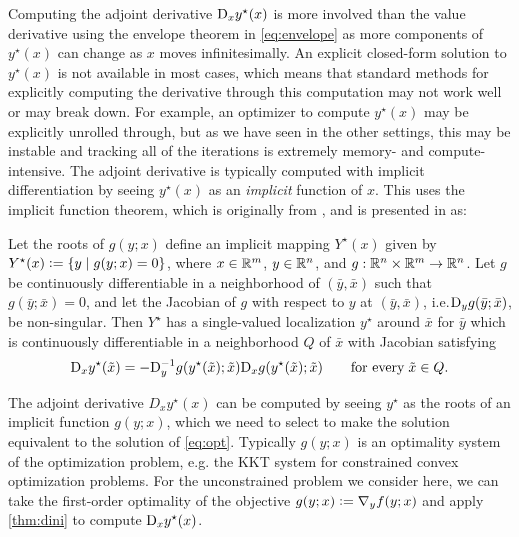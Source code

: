 \documentclass[twoside,11pt]{article}
\newcommand{\eg}{e.g.\xspace}
\newcommand{\ie}{i.e.\xspace}
\begin{document}
Computing the adjoint derivative $\mathrm{D}_x y^\star(x)$ is more involved
than the value derivative using the envelope theorem
in \cref{eq:envelope} as more components of $y^\star(x)$
can change as $x$ moves infinitesimally.
An explicit closed-form solution to $y^\star(x)$ is
not available in most cases, which means that standard
methods for explicitly computing the derivative through
this computation may not work well or may break down.
For example, an optimizer to compute $y^\star(x)$ may be
explicitly unrolled through, but as we have seen in the
other settings, this may be instable and tracking all
of the iterations is extremely memory- and
compute-intensive.
The adjoint derivative is typically computed with implicit
differentiation by seeing $y^\star(x)$ as an \emph{implicit}
function of $x$.
This uses the implicit function theorem,
which is originally from \citet{dini1878analisi},
and is presented in \citet[Theorem 1B.1]{dontchev2009implicit} as:
\begin{theorem}
  \label{thm:dini}
  Let the roots of $g(y; x)$ define an implicit
  mapping $Y^\star(x)$ given by $Y^\star(x)\vcentcolon=\{y \mid g(y;x)=0\}$,
  where $x\in\mathbb{R}^m$, $y\in\mathbb{R}^n$, and
  $g: \mathbb{R}^n\times\mathbb{R}^m\rightarrow\mathbb{R}^n$.
  Let $g$ be continuously differentiable in a neighborhood of $(\bar y, \bar x)$
  such that $g(\bar y; \bar x)=0$, and let the Jacobian of $g$
  with respect to $y$ at $(\bar y, \bar x)$,
  \ie $\mathrm{D}_y g(\bar y; \bar x)$, be non-singular.
  Then $Y^\star$ has a single-valued localization $y^\star$
  around $\bar x$ for $\bar y$ which is continuously differentiable
  in a neighborhood $Q$ of $\bar x$ with Jacobian satisfying
  \begin{equation}
    \mathrm{D}_x y^\star(\tilde x) = -\mathrm{D}_y^{-1} g(y^\star(\tilde x); \tilde x) \mathrm{D}_x g(y^\star(\tilde x); \tilde x)
    \qquad \mathrm{for\ every}\; \tilde x\in Q.
    \label{eq:implicit-derivative}
  \end{equation}
\end{theorem}

The adjoint derivative $D_x y^\star(x)$ can be computed
by seeing $y^\star$ as the roots of an implicit
function $g(y;x)$, which we need to select to
make the solution equivalent to the solution
of \cref{eq:opt}.
Typically $g(y;x)$ is an optimality system of
the optimization problem, \eg the KKT system
for constrained convex optimization problems.
For the unconstrained problem we consider here,
we can take the first-order optimality of
the objective $g(y;x) \vcentcolon= \nabla_y f(y; x)$
and apply \cref{thm:dini} to compute
$\mathrm{D}_x y^\star(x)$.
\end{document}
